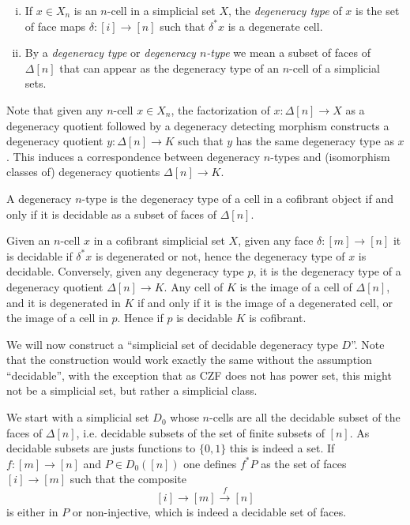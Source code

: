 \documentclass[reqno,10pt,a4paper,oneside,draft]{amsart}
\makeatletter
\renewenvironment{proof}[1][\proofname] {\par\pushQED{\qed}\normalfont\topsep6\p@\@plus6\p@\relax\trivlist\item[\hskip\labelsep\bf#1\@addpunct{.}]\ignorespaces}{\popQED\endtrivlist\@endpefalse}
\numberwithin{equation}{section}
\theoremstyle{mythm}
\theoremstyle{mydef}
\theoremstyle{myrmk}
\newcommand{\co}{\colon}
\makeatother
\begin{document}
\begin{definition}\hfill
\begin{enumerate}[(i)]  
\item If $x \in X_n$ is an $n$-cell in a simplicial set $X$, the \emph{degeneracy type} of $x$ is the set of face maps $\delta:[i] \rightarrow [n]$ such that $\delta^* x$ is a degenerate cell.
\item By a \emph{degeneracy type} or \emph{degeneracy $n$-type} we mean a subset of faces of $\Delta[n]$ that can appear as the degeneracy type of an $n$-cell of a simplicial sets.
\end{enumerate}
\end{definition}

\medskip

Note that given any $n$-cell $x \in X_n$, the factorization of $x \co \Delta[n] \rightarrow X$ as a degeneracy quotient followed by a degeneracy detecting morphism constructs a degeneracy quotient $y \co \Delta[n] \rightarrow K$ such that $y$ has the same degeneracy type as $x$. This induces a correspondence between degeneracy $n$-types and (isomorphism classes of) degeneracy quotients $\Delta[n] \rightarrow K$. 

\begin{lemma} A degeneracy $n$-type is the degeneracy type of a cell in a cofibrant object  if and only if it is decidable as a subset of faces of $\Delta[n]$.
\end{lemma}


\begin{proof}
Given an $n$-cell $x$ in a cofibrant simplicial set $X$, given any face $\delta:[m] \rightarrow [n]$ it is decidable if $\delta^* x$ is degenerated or not, hence the degeneracy type of $x$ is decidable. Conversely, given any degeneracy type $p$, it is the degeneracy type of a degeneracy quotient $\Delta[n] \rightarrow K$. Any cell of $K$ is the image of a cell of $\Delta[n]$, and it is degenerated in $K$ if and only if it is the image of a degenerated cell, or the image of a cell in $p$. Hence if $p$ is decidable $K$ is cofibrant.
\end{proof}


We will now construct a ``simplicial set of decidable degeneracy type $D$''. Note that the construction would work exactly the same without the assumption ``decidable'', with the exception that as CZF does not has power set, this might not be a simplicial set, but rather a simplicial class.


 We start with a simplicial set $D_0$ whose $n$-cells are all the decidable subset of the faces of $\Delta[n]$, i.e. decidable subsets of the set of finite subsets of $[n]$. As decidable subsets are justs functions to $\{0,1\}$ this is indeed a set.  If $f : [m] \rightarrow [n]$ and $P \in D_0([n])$ one defines $f^* P$ as the set of faces  $[i] \rightarrow [m]$ such that the composite 
 \[
 [i] \rightarrow [m] \overset{f}{\rightarrow} [n]
 \] is either in $P$ or non-injective, which is indeed a decidable set of faces.
\end{document}
